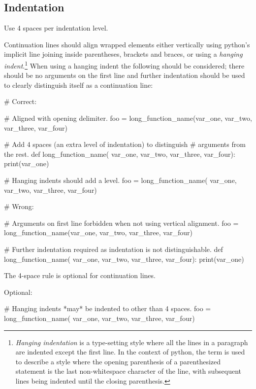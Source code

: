 \documentclass[a4paper,11pt]{article}
\begin{document}
\subsection{Indentation}
Use 4 spaces per indentation level.
\par
Continuation lines should align wrapped elements either vertically using
python’s implicit line joining inside parentheses, 
brackets and braces, or using a {\it hanging indent}.\footnote{{\it Hanging
indentation} is a type-setting style where all the lines in a paragraph are
indented except the first line. In the context of python, the term is used to
describe a style where the opening parenthesis of a parenthesized statement is
the last non-whitespace character of the line, with subsequent lines being
indented until the closing parenthesis.} When using a hanging indent the
following should be considered; there should be no arguments on the first line
and further indentation should be used to clearly distinguish itself as a
continuation line:
\par
\begin{python}
# Correct:

# Aligned with opening delimiter.
foo = long_function_name(var_one, var_two,
                         var_three, var_four)

# Add 4 spaces (an extra level of indentation) to distinguish
# arguments from the rest.
def long_function_name(
        var_one, var_two, var_three,
        var_four):
    print(var_one)

# Hanging indents should add a level.
foo = long_function_name(
    var_one, var_two,
    var_three, var_four)
\end{python}
\begin{python}
# Wrong:

# Arguments on first line forbidden when not using vertical alignment.
foo = long_function_name(var_one, var_two,
    var_three, var_four)

# Further indentation required as indentation is not distinguishable.
def long_function_name(
    var_one, var_two, var_three,
    var_four):
    print(var_one)
\end{python}
The 4-space rule is optional for continuation lines.
\par
Optional:
\par
\begin{python}
# Hanging indents *may* be indented to other than 4 spaces.
foo = long_function_name(
    var_one, var_two,
    var_three, var_four)
\end{python}
\end{document}
